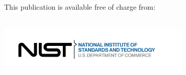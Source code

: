 \usepackage{makecell}

\newcommand{\zws}{\hspace{0pt}}


\begin{titlepage}
\begin{flushright}
\LARGE{}\\
\LARGE{\sffamily{\textbf{\pubnumber}}}\\
\vfill
\Huge{\sffamily{\textbf{\pubtitle}}}\\
\ifdefined\pubsubtitle
\Large{\sffamily{\textit{\pubsubtitle}}}\\
\fi
    \vfill
\large \authorone\\
\large \authortwo\\
\large \authorthree\\
\large \authorfour\\
\vfill
\normalsize This publication is available free of charge from:\\
\DOI\\
\vfill

\includegraphics[trim=0 0 0.7in 0,clip,width=3.62in]{NIST-logo.png}\\
\end{flushright}
\end{titlepage}
